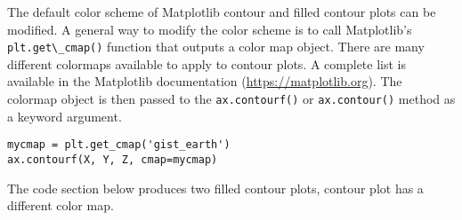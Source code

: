 \documentclass{book}
\newcommand{\passthrough}[1]{#1}
\begin{document}
    
        The default color scheme of Matplotlib contour and filled contour plots
can be modified. A general way to modify the color scheme is to call
Matplotlib's \passthrough{\lstinline!plt.get\_cmap()!} function that
outputs a color map object. There are many different colormaps available
to apply to contour plots. A complete list is available in the
Matplotlib documentation (\url{https://matplotlib.org}). The colormap
object is then passed to the \passthrough{\lstinline!ax.contourf()!} or
\passthrough{\lstinline!ax.contour()!} method as a keyword argument.

\begin{lstlisting}
mycmap = plt.get_cmap('gist_earth')
ax.contourf(X, Y, Z, cmap=mycmap)
\end{lstlisting}

The code section below produces two filled contour plots, contour plot
has a different color map.
    
\end{document}

